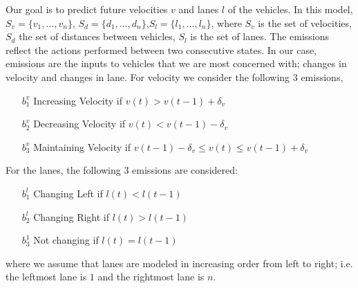 \documentclass[letterpaper, 10 pt, conference]{ieeeconf}  %
\newcommand\NB[1]{$\spadesuit$\footnote{NB: #1}}
\newcommand\RP[1]{$\clubsuit$\footnote{RP: #1}}
\begin{document}
Our goal is to predict future velocities $v$ and lanes $l$ of the vehicles. In this model, $S_v = \{v_1,\ldots, v_n\}$, $S_d = \{d_1,\ldots,d_n\}$,$S_l = \{l_1,\ldots,l_n\}$, where $S_v$ is the set of velocities, $S_d$ the set of distances between vehicles, $S_l$ is the set of lanes. The emissions reflect the actions performed between two consecutive states. In our case, emissions are the inputs to vehicles that we are most concerned with; changes in velocity and changes in lane. %
For velocity we consider the following 3 emissions,
    

\begin{itemize}
    \item[$b_1^v$] {Increasing Velocity if $v(t) > v(t-1)+\delta_v$} 
    \item[$b_2^v$] {Decreasing Velocity if $v(t) < v(t-1)-\delta_v$}
    \item[$b_3^v$] {Maintaining Velocity if $v(t-1)-\delta_v \leq v(t) \leq v(t-1)+\delta_v$}
\end{itemize}


For the lanes, the following 3 emissions are considered:

\begin{enumerate}
    \item[$b_1^l$] Changing Left if $l(t) < l(t-1)$
    \item[$b_2^l$] Changing Right if $l(t) > l(t-1)$
    \item[$b_3^1$] Not changing if  $l(t) = l(t-1)$
\end{enumerate}
where we assume that lanes are modeled in increasing order from left to right; i.e. the leftmost lane is $1$ and the rightmost lane is $n$.
\end{document}
